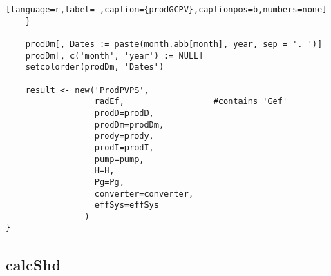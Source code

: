 \begin{lstlisting}[language=r,label= ,caption={prodGCPV},captionpos=b,numbers=none]
    }

    prodDm[, Dates := paste(month.abb[month], year, sep = '. ')]
    prodDm[, c('month', 'year') := NULL]
    setcolorder(prodDm, 'Dates')

    result <- new('ProdPVPS',
                  radEf,                  #contains 'Gef'
                  prodD=prodD,
                  prodDm=prodDm,
                  prody=prody,
                  prodI=prodI,
                  pump=pump,
                  H=H,
                  Pg=Pg,
                  converter=converter,
                  effSys=effSys
                )
}
\end{lstlisting}
\subsection{calcShd}
\label{sec:org29bdc95}
\label{subsec:calcShd}
